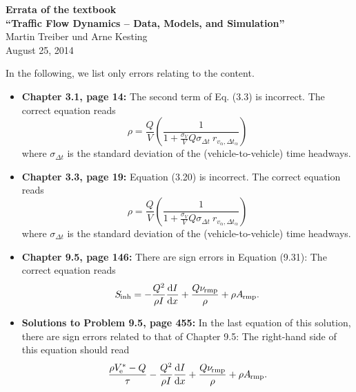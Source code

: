 \documentclass[11pt,a4paper]{scrreprt}
\providecommand{\be}{\begin{equation}}
\providecommand{\ee}{\end{equation}}
\providecommand{\bdm}{\begin{displaymath}}
\providecommand{\edm}{\end{displaymath}}
\providecommand{\secfont}[1]{{\Large\sf\textbf{#1}}}
\providecommand{\abl}[2]{\frac{{\rm d} #1}{{\rm d} #2}}  %
\providecommand{\sub}[1]{_{\text{{\scriptsize \hspace{-0.2ex}#1}}}}
\begin{document}
\begin{center}
\secfont{Errata of the textbook\\[0.3em]
``Traffic Flow Dynamics --  Data, Models, and Simulation''}
\\[1em]

Martin Treiber und Arne Kesting
\\[1em]

August 25, 2014
\end{center}
\vspace{1em}


In the following, we list only errors relating to the content.


\begin{itemize}

\item
\textbf{Chapter 3.1, page 14:}
The second term of Eq. (3.3) is incorrect. The correct equation reads 
\setcounter{chapter}{3}
\setcounter{equation}{3}
\be
\rho=\frac{Q}{V}\left(\frac{1}{1+\frac{\sigma_V}{V}Q\sigma_{\Delta t} \
r_{v_{\alpha},\Delta t_{\alpha}}}\right)
\ee
where $\sigma_{\Delta t}$ is the standard deviation of the
(vehicle-to-vehicle) time headways.


\item
\textbf{Chapter 3.3, page 19:}
Equation (3.20) is incorrect. The correct equation reads 
\setcounter{chapter}{3}
\setcounter{equation}{20}
\be
\rho=\frac{Q}{V}\left(\frac{1}{1+\frac{\sigma_V}{V}Q\sigma_{\Delta t} \
r_{v_{\alpha},\Delta t_{\alpha}}}\right)
\ee
where $\sigma_{\Delta t}$ is the standard deviation of the
(vehicle-to-vehicle) time headways.

\item
\textbf{Chapter 9.5, page 146:}
There are sign errors in Equation (9.31): The correct equation reads
\setcounter{chapter}{9}
\setcounter{equation}{30}
\be
S\sub{inh}=-\frac{Q^2}{\rho I} \abl{I}{x}
+\frac{Q \nu\sub{rmp}}{\rho}+\rho A\sub{rmp}.
\ee

\item \textbf{Solutions to Problem 9.5, page 455:}
In the last equation of this solution, there are sign errors related to that of Chapter
9.5: The right-hand side of this equation should read
\bdm
\frac{\rho V^*\sub{e}-Q}{\tau} -\frac{Q^2}{\rho I} \abl{I}{x}
+\frac{Q \nu\sub{rmp}}{\rho}+\rho A\sub{rmp}.
\edm



\end{itemize}
\end{document}
